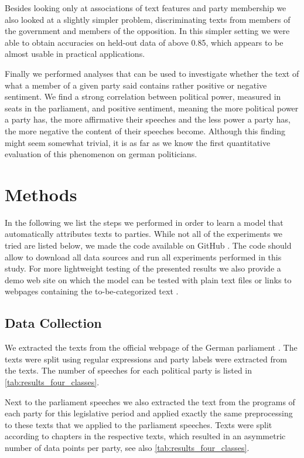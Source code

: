 \documentclass{article} %
\begin{document}
Besides looking only at associations of text features and party membership we also looked at a slightly simpler problem, discriminating texts from members of the government and members of the opposition. In this simpler setting we were able to obtain accuracies on held-out data of above 0.85, which appears to be almost usable in practical applications. 

Finally we performed analyses that can be used to investigate whether the text of what a member of a given party said contains rather positive or negative sentiment. We find a strong correlation between political power, measured in seats in the parliament, and positive sentiment, meaning the more political power a party has, the more affirmative their speeches and the less power a party has, the more negative the content of their speeches become. Although this finding might seem somewhat trivial, it is as far as we know the first quantitative evaluation of this phenomenon on german politicians. 

\section{Methods}

In the following we list the steps we performed in order to learn a model that automatically attributes texts to parties. While not all of the experiments we tried are listed below, we made the code available on GitHub \cite{linksrechts_code}. The code should allow to download all data sources and run all experiments performed in this study. For more lightweight testing of the presented results we also provide a demo web site on which the model can be tested with plain text files or links to webpages containing the to-be-categorized text \cite{linksrechts}. 

\subsection{Data Collection}\label{sec:collection}
We extracted the texts from the official webpage of the German parliament \cite{plenarprotokolle}. The texts were split using regular expressions and party labels were extracted from the texts. The number of speeches for each political party is listed in \autoref{tab:results_four_classes}. 

Next to the parliament speeches we also extracted the text from the programs of each party for this legislative period \cite{linke_parteiprogramm, gruene_parteiprogramm,spd_parteiprogramm, cdu_parteiprogramm} and applied exactly the same preprocessing to these texts that we applied to the parliament speeches. Texts were split according to chapters in the respective texts, which resulted in an asymmetric number of data points per party, see also \autoref{tab:results_four_classes}.
\end{document}
